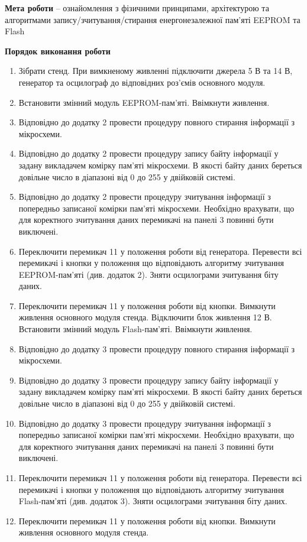 \documentclass[a4paper,14pt]{extreport}
\begin{document}
\textbf{Мета роботи} -- ознайомлення з фізичними принципами, архітектурою та
алгоритмами запису/зчитування/стирання енергонезалежної пам’яті
EEPROM та Flash
\begin{center}
\textbf{Порядок виконання роботи}
\end{center}
	\begin{enumerate}


	\item  Зібрати стенд. При вимкненому живленні підключити джерела 5 В та
14 В, генератор та осцилограф до відповідних роз’ємів основного модуля.
	\item  Встановити змінний модуль EEPROM-пам’яті. Ввімкнути живлення.
	\item  Відповідно до додатку 2 провести процедуру повного стирання
інформації з мікросхеми.
	\item  Відповідно до додатку 2 провести процедуру запису байту інформації у
задану викладачем комірку пам’яті мікросхеми. В якості байту даних
береться довільне число в діапазоні від 0 до 255 у двійковій системі.
	\item  Відповідно до додатку 2 провести процедуру зчитування інформації з
попередньо записаної комірки пам’яті мікросхеми. Необхідно врахувати, що
для коректного зчитування даних перемикачі на панелі 3 повинні бути
виключені.
	\item  Переключити перемикач 11 у положення роботи від генератора.
Перевести всі перемикачі і кнопки у положення що відповідають алгоритму
зчитування EEPROM-пам’яті (див. додаток 2). Зняти осцилограми
зчитування біту даних.
	\item  Переключити перемикач 11 у положення роботи від кнопки. Вимкнути
живлення основного модуля стенда. Відключити блок живлення 12 В.
Встановити змінний модуль Flash-пам’яті. Ввімкнути живлення.
	\item  Відповідно до додатку 3 провести процедуру повного стирання
інформації з мікросхеми.
	\item  Відповідно до додатку 3 провести процедуру запису байту інформації у
задану викладачем комірку пам’яті мікросхеми. В якості байту даних
береться довільне число в діапазоні від 0 до 255 у двійковій системі.
	\item  Відповідно до додатку 3 провести процедуру зчитування інформації з
попередньо записаної комірки пам’яті мікросхеми. Необхідно врахувати, що
для коректного зчитування даних перемикачі на панелі 3 повинні бути
виключені.
	\item  Переключити перемикач 11 у положення роботи від генератора.
Перевести всі перемикачі і кнопки у положення що відповідають алгоритму
зчитування Flash-пам’яті (див. додаток 3). Зняти осцилограми зчитування
біту даних.
	\item  Переключити перемикач 11 у положення роботи від кнопки.
Вимкнути живлення основного модуля стенда.
	\end{enumerate}
\end{document}
